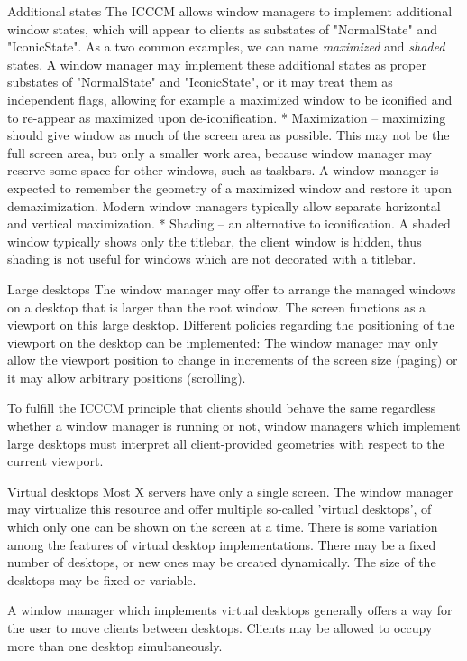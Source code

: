 \secc Additional states
The ICCCM allows window managers to implement additional window states, which will appear to clients as substates of "NormalState" and "IconicState".
As a two common examples, we can name {\em maximized} and {\em shaded} states.
A window manager may implement these additional states as proper substates of "NormalState" and "IconicState",
or it may treat them as independent flags, allowing for example a maximized window to be iconified and to re-appear as maximized upon de-iconification.
\begitems
* {\sbf Maximization} -- maximizing should give window as much of the screen area as possible.
This may not be the full screen area, but only a smaller work area, because window manager may
reserve some space for other windows, such as taskbars.
A window manager is expected to remember the geometry of a maximized window and restore it upon demaximization.
Modern window managers typically allow separate horizontal and vertical maximization.
* {\sbf Shading} -- an alternative to iconification.
A shaded window typically shows only the titlebar, the client window is hidden, thus shading is not useful for windows which are not decorated with a titlebar.
\enditems

\secc Large desktops
The window manager may offer to arrange the managed windows on a desktop that is larger than the root window.
The screen functions as a viewport on this large desktop.
Different policies regarding the positioning of the viewport on the desktop can be implemented: The window manager may only allow the viewport position to change in increments of
the screen size (paging) or it may allow arbitrary positions (scrolling).

To fulfill the ICCCM principle that clients should behave the same regardless whether a window manager is running or not,
window managers which implement large desktops must interpret all client-provided geometries with respect to the current viewport.

\secc Virtual desktops
Most X servers have only a single screen.
The window manager may virtualize this resource and offer multiple so-called 'virtual desktops', of which only one can be shown on the screen at a time.
There is some variation among the features of virtual desktop implementations.
There may be a fixed number of desktops, or new ones may be created dynamically.
The size of the desktops may be fixed or variable.

A window manager which implements virtual desktops generally offers a way for the user to move clients between desktops.
Clients may be allowed to occupy more than one desktop simultaneously.

